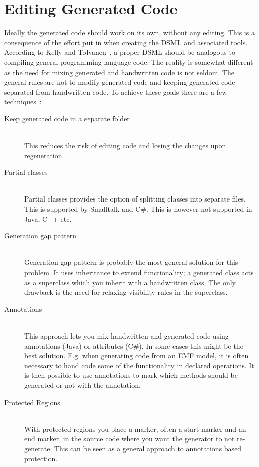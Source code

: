 \section{Editing Generated Code}
Ideally the generated code should work on its own, without any editing. This is a consequence of the effort put in when creating the DSML and associated tools. According to Kelly and Tolvanen~\cite{tolvanen:dsm}, a proper DSML should be analogous to compiling general programming language code.
The reality is somewhat different as the need for mixing generated and handwritten code is not seldom. The general rules are not to modify generated code and keeping generated code separated from handwritten code. To achieve these goals there are a few techniques~\cite{fowler2010domain}:
\begin{description}
  \item[Keep generated code in a separate folder] \hfill \\
  This reduces the risk of editing code and losing the changes upon regeneration.
  \item[Partial classes] \hfill \\
  Partial classes provides the option of splitting classes into separate files. This is supported by Smalltalk and C\#. This is however not supported in Java, C++ etc.
  \item[Generation gap pattern] \hfill \\
  Generation gap pattern is probably the most general solution for this problem. It uses inheritance to extend functionality; a generated class acts as a superclass which you inherit with a handwritten class. The only drawback is the need for relaxing visibility rules in the superclass.
  \item[Annotations] \hfill \\
  This approach lets you mix handwritten and generated code using annotations (Java) or attributes (C\#). In some cases this might be the best solution. E.g. when generating code from an EMF model, it is often necessary to hand code some of the functionality in declared operations. It is then possible to use annotations to mark which methods should be generated or not with the  annotation.
  \item[Protected Regions] \hfill \\
  With protected regions you place a marker, often a start marker and an end marker, in the source code where you want the generator to not re-generate. This can be seen as a general approach to annotations based protection.
\end{description}


